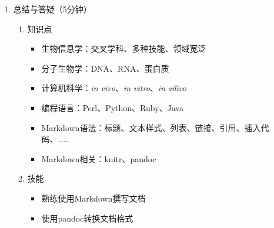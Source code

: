 \documentclass{TIJMUjiaoanLL}
\begin{document}
\begin{enumerate}
\otherTail
\newpage
\otherHeader

  \item 总结与答疑（5分钟）
    \begin{enumerate}
      \item 知识点
	\begin{itemize}
	  \item 生物信息学：交叉学科、多种技能、领域宽泛
	  \item 分子生物学：DNA、RNA、蛋白质
	  \item 计算机科学：\textit{in vivo}、\textit{in vitro}、\textit{in silico}
	  \item 编程语言：Perl、Python、Ruby、Java
	  \item Markdown语法：标题、文本样式、列表、链接、引用、插入代码、……
	  \item Markdown相关：knitr、pandoc
	\end{itemize}
      \item 技能
	\begin{itemize}
	  \item 熟练使用Markdown撰写文档
	  \item 使用pandoc转换文档格式
	\end{itemize}
    \end{enumerate}
\end{enumerate}

\otherTail
\end{document}
